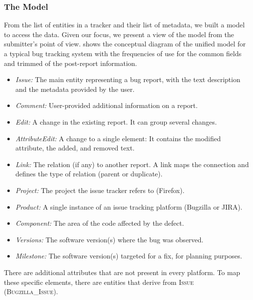 \subsubsection{The Model}

From the list of entities in a tracker and their list of metadata, we built a model to access the data.
Given our focus, we present a view of the model from the submitter's point of view.
 shows the conceptual diagram of the unified model for a typical bug tracking system with the frequencies of use for the common fields and trimmed of the post-report information.


\begin{itemize}[$\circ$]
\item \textit{Issue:} The main entity representing a bug report, with the text description and the metadata provided by the user.
\item \textit{Comment:} User-provided additional information on a report.
\item \textit{Edit:} A change in the existing report.
It can group several changes.
\item \textit{AttributeEdit:} A change to a single element: It contains the modified attribute, the added, and removed text.
\item \textit{Link:} The relation (if any) to another report.
A link maps the connection and defines the type of relation (\eg parent or duplicate).
\item \textit{Project:} The project the issue tracker refers to (\eg Firefox).
\item \textit{Product:} A single instance of an issue tracking platform (\eg Bugzilla or JIRA).
\item \textit{Component:} The area of the code affected by the defect.
\item \textit{Versions:} The software version(s) where the bug was observed.
\item \textit{Milestone:} The software version(s) targeted for a fix, for planning purposes.
\end{itemize}

There are additional attributes that are not present in every platform.
To map these specific elements, there are entities that derive from \textsc{Issue} (\eg \textsc{Bugzilla\_Issue}).

